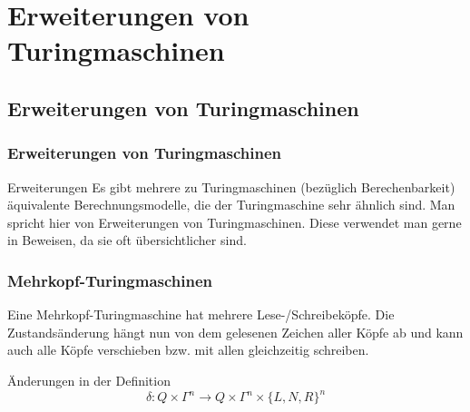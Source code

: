 \section{Erweiterungen von Turingmaschinen}
\subsection{Erweiterungen von Turingmaschinen}
\begin{frame}
\frametitle{Erweiterungen von Turingmaschinen}
\begin{block}{Erweiterungen}
Es gibt mehrere zu Turingmaschinen (bezüglich Berechenbarkeit) äquivalente Berechnungsmodelle, die der Turingmaschine sehr ähnlich sind. Man spricht hier von Erweiterungen von Turingmaschinen. Diese verwendet man gerne in Beweisen, da sie oft übersichtlicher sind.
\end{block}
\end{frame}
\begin{frame}
\frametitle{Mehrkopf-Turingmaschinen}
\begin{figure}[H]
\begin{center}
\end{center}
\end{figure}
Eine Mehrkopf-Turingmaschine hat mehrere Lese-/Schreibeköpfe. Die Zustandsänderung hängt nun von dem gelesenen Zeichen aller Köpfe ab und kann auch alle Köpfe verschieben bzw. mit allen gleichzeitig schreiben.
\begin{block}{Änderungen in der Definition}
$$ \delta: Q \times \Gamma^n \rightarrow Q \times \Gamma^n \times \{L,N,R\}^n$$
\end{block}
\end{frame}

